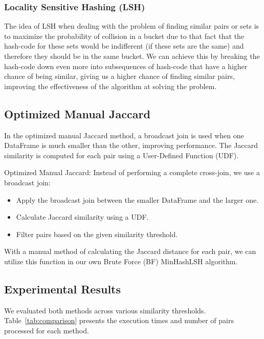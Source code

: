 \subsubsection{Locality Sensitive Hashing (LSH)}

The idea of LSH when dealing with the problem of finding similar pairs or sets is to maximize the probability of collision in a bucket due to that fact that the hash-code for these sets would be indifferent (if these sets are the same) and therefore they should be in the same bucket.
We can achieve this by breaking the hash-code down even more into subsequences of hash-code that have a higher chance of being similar, giving us a higher chance of finding similar pairs, improving the effectiveness of the algorithm at solving the problem.

\subsection{Optimized Manual Jaccard}
\label{subsec:optimized-manual-jaccard}
In the optimized manual Jaccard method, a broadcast join is used when one DataFrame is much smaller than the other, improving performance.
The Jaccard similarity is computed for each pair using a User-Defined Function (UDF).

Optimized Manual Jaccard: Instead of performing a complete cross-join, we use a broadcast join:
\begin{itemize}
    \item Apply the broadcast join between the smaller DataFrame and the larger one.
    \item Calculate Jaccard similarity using a UDF.
    \item Filter pairs based on the given similarity threshold.
\end{itemize}

With a manual method of calculating the Jaccard distance for each pair, we can utilize this function in our own Brute Force (BF) MinHashLSH algorithm.

\subsection{Experimental Results}
\label{subsec:experimental-results2}
We evaluated both methods across various similarity thresholds.
Table~\ref{tab:comparison} presents the execution times and number of pairs processed for each method.

